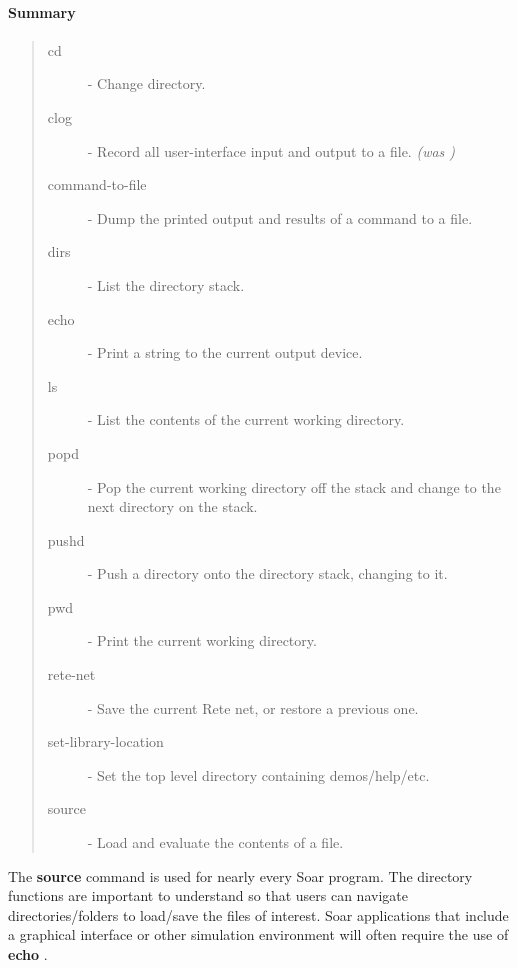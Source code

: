 \paragraph{Summary}
\begin{quote}
\begin{description}
\item[cd] - Change directory.
\item[clog] - Record all user-interface input and output to a file. \emph{(was )}
\item[command-to-file] - Dump the printed output and results of a command to a file. 
\item[dirs] - List the directory stack.
\item[echo] -  Print a string to the current output device.
\item[ls] - List the contents of the current working directory.
\item[popd] - Pop the current working directory off the stack and change to the next directory on the stack.
\item[pushd] - Push a directory onto the directory stack, changing to it.
\item[pwd] - Print the current working directory.
\item[rete-net] - Save the current Rete net, or restore a previous one.
\item[set-library-location] - Set the top level directory containing demos/help/etc.
\item[source] - Load and evaluate the contents of a file.
\end{description}
\end{quote}

The \textbf{source} command is used for nearly every Soar program.  The
directory functions are important to understand so that users can
navigate directories/folders to load/save the files of interest.  
Soar applications that include a graphical interface or other
simulation environment will often require the use of \textbf{echo}  .















